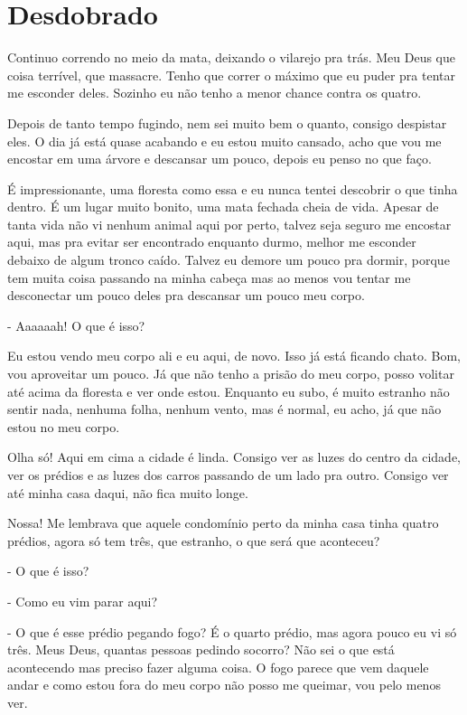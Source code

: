 \chapter{Desdobrado}

Continuo correndo no meio da mata, deixando o vilarejo pra trás. Meu Deus que coisa terrível, que massacre. Tenho que correr o máximo que eu puder pra tentar me esconder deles. Sozinho eu não tenho a menor chance contra os quatro.

Depois de tanto tempo fugindo, nem sei muito bem o quanto, consigo despistar eles. O dia já está quase acabando e eu estou muito cansado, acho que vou me encostar em uma árvore e descansar um pouco, depois eu penso no que faço.

É impressionante, uma floresta como essa e eu nunca tentei descobrir o que tinha dentro. É um lugar muito bonito, uma mata fechada cheia de vida. Apesar de tanta vida não vi nenhum animal aqui por perto, talvez seja seguro me encostar aqui, mas pra evitar ser encontrado enquanto durmo, melhor me esconder debaixo de algum tronco caído. Talvez eu demore um pouco pra dormir, porque tem muita coisa passando na minha cabeça mas ao menos vou tentar me desconectar um pouco deles pra descansar um pouco meu corpo.

 - Aaaaaah! O que é isso?

Eu estou vendo meu corpo ali e eu aqui, de novo. Isso já está ficando chato. Bom, vou aproveitar um pouco.
Já que não tenho a prisão do meu corpo, posso volitar até acima da floresta e ver onde estou. Enquanto eu subo, é muito estranho não sentir nada, nenhuma folha, nenhum vento, mas é normal, eu acho, já que não estou no meu corpo.

Olha só! Aqui em cima a cidade é linda. Consigo ver as luzes do centro da cidade, ver os prédios e as luzes dos carros passando de um lado pra outro. Consigo ver até minha casa daqui, não fica muito longe.

Nossa! Me lembrava que aquele condomínio perto da minha casa tinha quatro prédios, agora só tem três, que estranho, o que será que aconteceu?

- O que é isso?

- Como eu vim parar aqui?

- O que é esse prédio pegando fogo? 
É o quarto prédio, mas agora pouco eu vi só três. Meus Deus, quantas pessoas pedindo socorro? Não sei o que está acontecendo mas preciso fazer alguma coisa. O fogo parece que vem daquele andar e como estou fora do meu corpo não posso me queimar, vou pelo menos ver.

